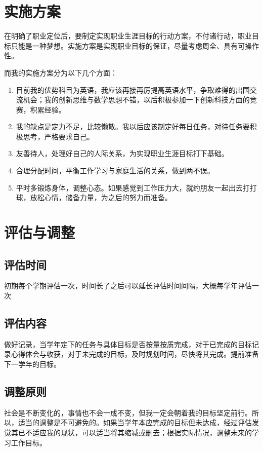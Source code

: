 \documentclass{article}
\begin{document}
\section{实施方案}
在明确了职业定位后，要制定实现职业生涯目标的行动方案，不付诸行动，职业目标只能是一种梦想。实施方案是实现职业目标的保证，尽量考虑周全、具有可操作性。\par
而我的实施方案分为以下几个方面：\par
\begin{enumerate}[1、]
	\item 目前我的优势科目为英语，我应该再接再厉提高英语水平，争取难得的出国交流机会；我的创新思维与数学思想不错，以后积极参加一下创新科技方面的竞赛，积累经验。
	\item 我的缺点是定力不足，比较懒散。我以后应该制定好每日任务，对待任务要积极思考，严格要求自己。
	\item 友善待人，处理好自己的人际关系，为实现职业生涯目标打下基础。
	\item 合理分配时间，平衡工作学习与家庭生活的关系，做到两不误。
	\item 平时多锻炼身体，调整心态。如果感觉到工作压力大，就约朋友一起出去打打球，放松心情，储备力量，为之后的努力而准备。
\end{enumerate}
\par 

\section{评估与调整}

\subsection{评估时间}
初期每个学期评估一次，时间长了之后可以延长评估时间间隔，大概每学年评估一次\par
\subsection{评估内容}
做好记录，当学年定下的任务与具体目标是否按量按质完成，对于已完成的目标记录心得体会与收获，对于未完成的目标，及时规划时间，尽快将其完成。提前准备下一学年的目标。\par
\subsection{调整原则}
社会是不断变化的，事情也不会一成不变，但我一定会朝着我的目标坚定前行。所以，适当的调整是不可避免的。如果当学年本应完成的目标但未达成，经过评估发觉其已不适应我的现状，可以适当将其缩减或删去；根据实际情况，调整未来的学习工作目标。\par
\end{document}

